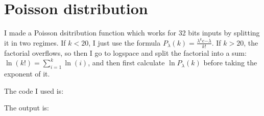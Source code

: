 \section{Poisson distribution}

I made a Poisson dsitribution function which works for 32 bits inputs by splitting it in two regimes.
If $k < 20$, I just use the formula $P_\lambda(k) = \frac{\lambda^k e{-\lambda}}{k!}$.
If $k > 20$, the factorial overflows, so then I go to logspace and split the factorial into a sum: 
$\ln(k!) = \sum_{i=1}^{k} \ln(i)$, and then first calculate $\ln P_\lambda(k)$ before taking the exponent of it. 

The code I used is:


The output is:

